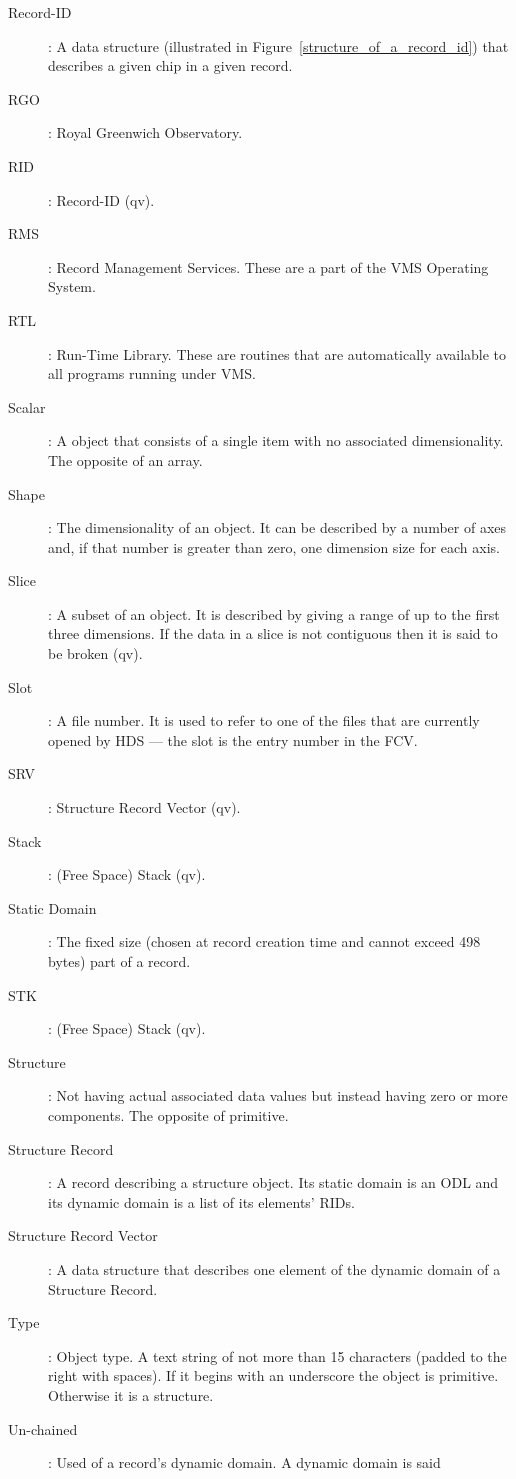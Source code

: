 \begin {description}
\item [Record-ID]: A data structure (illustrated in
Figure~\ref{structure_of_a_record_id}) that describes a given chip in a given
record.
\item [RGO]: Royal Greenwich Observatory.
\item [RID]: Record-ID (qv).
\item [RMS]: Record Management Services. These are a part of the VMS Operating
System.
\item [RTL]: Run-Time Library. These are routines that are automatically
available to all programs running under VMS.
\item [Scalar]: A object that consists of a single item with no associated
dimensionality. The opposite of an array.
\item [Shape]: The dimensionality of an object. It can be described by a
number of axes and, if that number is greater than zero, one dimension size
for each axis.
\item [Slice]: A subset of an object. It is described by giving a range of
up to the first three dimensions. If the data in a slice is not contiguous
then it is said to be broken (qv).
\item [Slot]: A file number. It is used to refer to one of the files that
are currently opened by HDS --- the slot is the entry number in the FCV.
\item [SRV]: Structure Record Vector (qv).
\item [Stack]: (Free Space) Stack (qv).
\item [Static Domain]: The fixed size (chosen at record creation time and
cannot exceed 498 bytes) part of a record.
\item [STK]: (Free Space) Stack (qv).
\item [Structure]: Not having actual associated data values but instead having
zero or more components. The opposite of primitive.
\item [Structure Record]: A record describing a structure object. Its static
domain is an ODL and its dynamic domain is a list of its elements' RIDs.
\item [Structure Record Vector]: A data structure that describes one element
of the dynamic domain of a Structure Record.
\item [Type]: Object type. A text string of not more than 15 characters
(padded to the right with spaces). If it begins with an underscore the object
is primitive. Otherwise it is a structure.
\item [Un-chained]: Used of a record's dynamic domain. A dynamic domain is said

\end{description}
